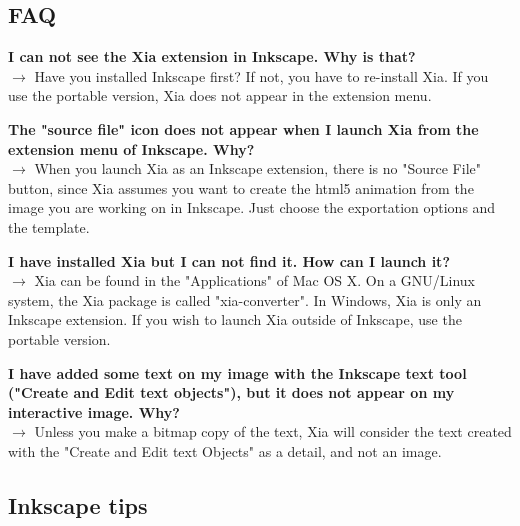 \subsection{FAQ}

\textbf{I can not see the Xia extension in Inkscape. Why is that?}\\
$\rightarrow$ Have you  installed Inkscape first? If not, you have to re-install
 Xia. If you use the portable version, Xia does not appear in the extension menu.
 
 \textbf{The "source file"  icon does not appear when I launch Xia from the extension
 menu of Inkscape. Why?}\\
 $\rightarrow$ When you launch Xia as an Inkscape extension,
 there is no "Source File" button, since Xia assumes you want 
 to create the html5 animation from the image you are working on in Inkscape. 
 Just choose the exportation options and the template.
 
 \textbf{I have installed Xia but I can not find it. How can I launch it?}\\
 $\rightarrow$ Xia can be found in the "Applications" of Mac OS X. 
 On a GNU/Linux system, the Xia package is called "xia-converter". 
 In Windows, Xia is only an Inkscape extension. If you wish to launch Xia
 outside of Inkscape, use the portable version.
 
 \textbf{I have added some text on my image with the Inkscape text tool
 ("Create and Edit text objects"),
 but it does not appear on my interactive image. Why?}\\
 $\rightarrow$ Unless you make a bitmap copy of 
 the text, Xia will consider the text created with the "Create and Edit text Objects"
 as a detail, and not an image.

\subsection{Inkscape tips}

